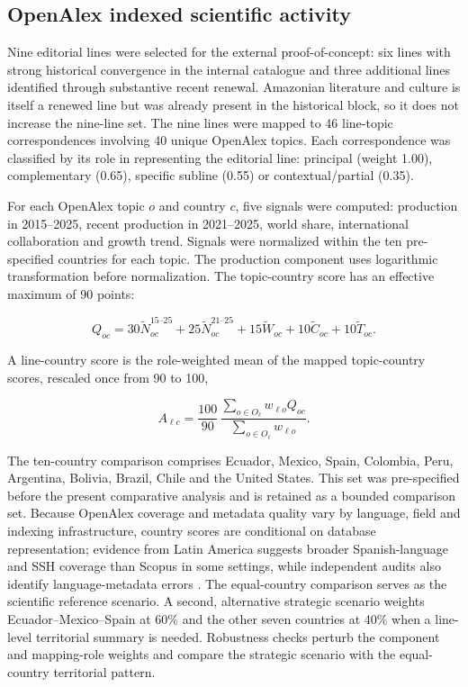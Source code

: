 \documentclass[futureinternet,article,submit,moreauthors]{Definitions/mdpi}
\begin{document}
\subsection{OpenAlex indexed scientific activity}\label{subsec:openalexmethod}

Nine editorial lines were selected for the external proof-of-concept: six lines with strong historical convergence in the internal catalogue and three additional lines identified through substantive recent renewal. Amazonian literature and culture is itself a renewed line but was already present in the historical block, so it does not increase the nine-line set. The nine lines were mapped to 46 line-topic correspondences involving 40 unique OpenAlex topics. Each correspondence was classified by its role in representing the editorial line: principal (weight 1.00), complementary (0.65), specific subline (0.55) or contextual/partial (0.35).

For each OpenAlex topic $o$ and country $c$, five signals were computed: production in 2015--2025, recent production in 2021--2025, world share, international collaboration and growth trend. Signals were normalized within the ten pre-specified countries for each topic. The production component uses logarithmic transformation before normalization. The topic-country score has an effective maximum of 90 points:

\begin{equation}
Q_{oc}=30\tilde{N}^{15\text{--}25}_{oc}+25\tilde{N}^{21\text{--}25}_{oc}
+15\tilde{W}_{oc}+10\tilde{C}_{oc}+10\tilde{T}_{oc}.
\label{eq:openalex}
\end{equation}

A line-country score is the role-weighted mean of the mapped topic-country scores, rescaled once from 90 to 100,

\begin{equation}
A_{\ell c}=\frac{100}{90}\,
\frac{\sum_{o\in O_{\ell}} w_{\ell o}Q_{oc}}
{\sum_{o\in O_{\ell}}w_{\ell o}}.
\label{eq:linecountry}
\end{equation}

The ten-country comparison comprises Ecuador, Mexico, Spain, Colombia, Peru, Argentina, Bolivia, Brazil, Chile and the United States. This set was pre-specified before the present comparative analysis and is retained as a bounded comparison set. Because \mbox{OpenAlex} coverage and metadata quality vary by language, field and indexing infrastructure, country scores are conditional on database representation; evidence from Latin America suggests broader Spanish-language and SSH coverage than Scopus in some settings, while independent audits also identify language-metadata errors \citep{gallardo2024openalex,cespedes2025linguistic}. The equal-country comparison serves as the scientific reference scenario. A second, alternative strategic scenario weights Ecuador--Mexico--Spain at 60\% and the other seven countries at 40\% when a line-level territorial summary is needed. Robustness checks perturb the component and mapping-role weights and compare the strategic scenario with the equal-country territorial pattern.
\end{document}
